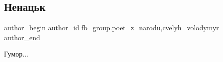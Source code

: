  
 
 
 
 

\subsection{Ненацьк}
\label{sec:02_05_2023.fb.fb_group.poet_z_narodu.1.nenack}
 
\ifcmt
 author_begin
   author_id fb_group.poet_z_narodu,cvelyh_volodymyr
 author_end
\fi

Гумор...


